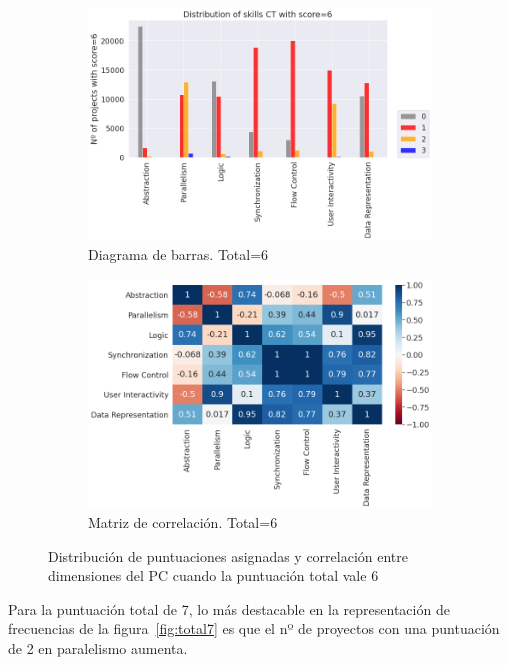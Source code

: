 \documentclass[a4paper, 12pt]{book}
\begin{document}
\begin{figure}[H]
    \centering
    \begin{subfigure}[h]{.49\textwidth} 
        \includegraphics[width=\textwidth]{img/distribucion_6_Scratch}
        \caption{Diagrama de barras. Total=6}
        \label{fig:total6}
    \end{subfigure}       
    \begin{subfigure}[h]{.49\textwidth} 
        \includegraphics[width=\textwidth]{img/corr_6_Scratch}
        \caption{Matriz de correlación. Total=6}
        \label{fig:corr6}
    \end{subfigure}
     \caption{Distribución de puntuaciones asignadas y correlación entre dimensiones del PC cuando la puntuación total vale 6}
\end{figure}

Para la puntuación total de 7, lo más destacable en la representación de frecuencias de la figura~\ref{fig:total7} es que el nº de proyectos con una puntuación de 2 en paralelismo aumenta.
\end{document}
